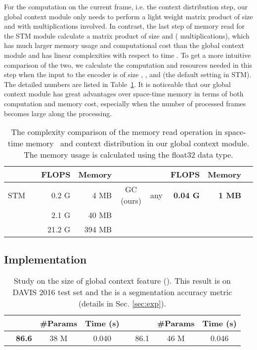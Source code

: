 \documentclass[runningheads]{llncs}
\begin{document}
For the computation on the current frame, i.e. the context distribution step, our global context module only needs to perform a light weight matrix product of size  and  with  multiplications involved. In contrast, the last step of memory read for the STM module calculate a matrix product of size  and  ( multiplications), which has much larger memory usage and computational cost than the global context module and has linear complexities with respect to time . To get a more intuitive comparison of the two, we calculate the computation and resources needed in this step when the input to the encoder is of size , , and  (the default setting in STM). The detailed numbers are listed in Table~\ref{tab:complexity}. It is noticeable that our global context module has great advantages over space-time memory in terms of both computation and memory cost, especially when the number of processed frames  becomes large along the processing.

\begin{table}[tb]
    \centering
    \caption{The complexity comparison of the memory read operation in space-time memory~\cite{stm} and context distribution in our global context module. The memory usage is calculated using the float32 data type.}
    \label{tab:complexity}
     \setlength{\tabcolsep}{6pt}
    \begin{tabular}{crrr|crrrr}
        \toprule
            &  & FLOPS & Memory& &  & FLOPS & Memory\\ 
        \midrule
        STM &  & 0.2 G & 4 MB & GC (ours) & any & \textbf{0.04 G} & \textbf{1 MB} \\
         &  & 2.1 G & 40 MB \\
         &  & 21.2 G & 394 MB \\ 
        \bottomrule
    \end{tabular}
\end{table}

\subsection{Implementation}

\begin{table}[tb]
    \centering
    \caption{Study on the size of global context feature (). This result is on DAVIS 2016 test set and the  is a segmentation accuracy metric (details in Sec. \ref{sec:exp}).}
    \label{tab:ablation}
    \setlength{\tabcolsep}{3pt}
    \begin{tabular}{cccc|cccc}
        \toprule
         &  & \#Params & Time (s) &  &  & \#Params & Time (s)\\ \midrule
         & \textbf{86.6} & 38 M & 0.040 &  & 86.1 & 46 M & 0.046 \\ \bottomrule
    \end{tabular}
\end{table}
\end{document}
